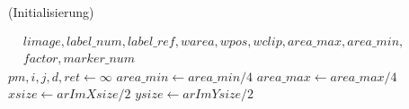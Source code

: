 \begin{algorithm}[!ht]\small
\caption{ (Initialisierung)}
\label{alg:detectmarker2-1}
\begin{algorithmic}[1]
	\Require $
	\begin{aligned}
		& \mathit{limage}, \mathit{label\_num}, \mathit{label\_ref}, \mathit{warea}, \mathit{wpos}, \mathit{wclip}, \mathit{area\_max}, \mathit{area\_min},\\
		& \mathit{factor}, \mathit{marker\_num}
	\end{aligned}$
	\State $\mathit{pm}, i, j, d, \mathit{ret} \gets \infty$
	\State $\mathit{area\_min} \gets \mathit{area\_min} / 4$
	\State $\mathit{area\_max} \gets \mathit{area\_max} / 4$
	\State $\mathit{xsize} \gets \mathit{arImXsize} / 2$
	\State $\mathit{ysize} \gets \mathit{arImYsize} / 2$
\end{algorithmic}
\end{algorithm}
